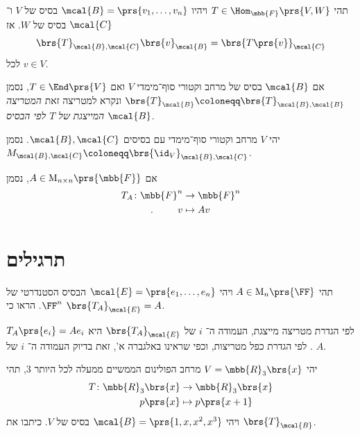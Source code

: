 \documentclass[a4paper,10pt,twoside,openany]{book}
\renewcommand{\Mat}{\mathrm{M}}
\begin{document}
\begin{proposition}
תהי
$T \in \Hom_{\mbb{F}}\prs{V,W}$
ויהיו
$\mcal{B} = \prs{v_1, \ldots, v_n}$
בסיס של
$V$
ו־%
$\mcal{C}$
בסיס של
$W$.
אז
\[\brs{T}_{\mcal{B},\mcal{C}} \brs{v}_\mcal{B} = \brs{T\prs{v}}_\mcal{C}\]
לכל
$v \in V$.
\end{proposition}

\begin{notation}
אם
$\mcal{B}$
בסיס של מרחב וקטורי סוף־מימדי
$V$
ואם
$T \in \End\prs{V}$,
נסמן
$\brs{T}_\mcal{B} \coloneqq \brs{T}_{\mcal{B},\mcal{B}}$
ונקרא למטריצה זאת
\emph{המטריצה המייצגת של
$T$
לפי הבסיס
$\mcal{B}$}.
\end{notation}

\begin{notation}
יהי
$V$
מרחב וקטורי סוף־מימדי עם בסיסים
$\mcal{B},\mcal{C}$.
נסמן
$M_{\mcal{B},\mcal{C}} \coloneqq \brs{\id_V}_{\mcal{B},\mcal{C}}$.
\end{notation}

\begin{notation}
אם
$A \in \Mat_{n\times n}\prs{\mbb{F}}$,
נסמן
\begin{align*}
T_A \colon \mbb{F}^n &\to \mbb{F}^n \\
\text{.} \hphantom{lalala} v &\mapsto Av
\end{align*}
\end{notation}

\section{תרגילים}

\begin{exercisechap}
תהי
$A \in \Mat_n\prs{\FF}$
ויהי
$\mcal{E} = \prs{e_1, \ldots, e_n}$
הבסיס הסטנדרטי של
$\FF^n$.
הראו כי
$\brs{T_A}_{\mcal{E}} = A$.
\end{exercisechap}

\begin{solution}
לפי הגדרת מטריצה מייצגת, העמודה ה־%
$i$
של
$\brs{T_A}_{\mcal{E}}$
היא
$T_A \prs{e_i} = A e_i$.
לפי הגדרת כפל מטריצות, וכפי שראינו באלגברה א', זאת בדיוק העמודה ה־%
$i$
של
$A$.
\end{solution}

\begin{exercisechap}\label{ex:p(x+1)}
יהי
$V = \mbb{R}_3\brs{x}$
מרחב הפולינום הממשיים ממעלה לכל היותר
$3$,
תהי
\begin{align*}
T \colon \mbb{R}_3\brs{x} &\to \mbb{R}_3\brs{x} \\
p\prs{x} &\mapsto p\prs{x+1}
\end{align*}
ויהי
$\mcal{B} = \prs{1,x,x^2,x^3}$
בסיס של
$V$.
כיתבו את
$\brs{T}_\mcal{B}$.
\end{exercisechap}
\end{document}
